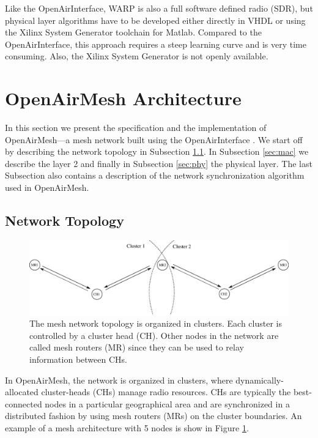 \documentclass[a4paper,twocolumn,journal]{IEEEtran}
\begin{document}
Like the OpenAirInterface, WARP is also a full software defined radio (SDR), but physical layer algorithms have to be developed either directly in VHDL or using the Xilinx System Generator toolchain for Matlab. Compared to the OpenAirInterface, this approach requires a steep learning curve and is very time consuming. Also, the Xilinx System Generator is not openly available.


\section{OpenAirMesh Architecture}
\label{sec:architecture}

In this section we present the specification and the implementation of OpenAirMesh---a mesh network built using the OpenAirInterface \cite{anouar08}. We start off by describing the network topology in Subsection \ref{sec:topology}. In Subsection \ref{sec:mac} we describe the layer 2 and finally in Subsection \ref{sec:phy} the physical layer. The last Subsection also contains a description of the network synchronization algorithm used in OpenAirMesh.

\subsection{Network Topology}
\label{sec:topology}

\begin{figure}
 \includegraphics[width=\textwidth]{figures/5nodes}
\caption{The mesh network topology is organized in clusters. Each cluster is controlled by a cluster head (CH). Other nodes in the network are called mesh routers (MR) since they can be used to relay information between CHs.}
\label{fig:mesh_topology}
\end{figure}

In OpenAirMesh, the network is organized in clusters, where dynamically-allocated cluster-heads (CHs) manage radio resources. CHs are typically the best-connected nodes in a particular geographical area and are synchronized in a distributed fashion by using mesh routers (MRs) on the cluster boundaries. An example of a mesh architecture with 5 nodes is show in Figure \ref{fig:mesh_topology}.
\end{document}
